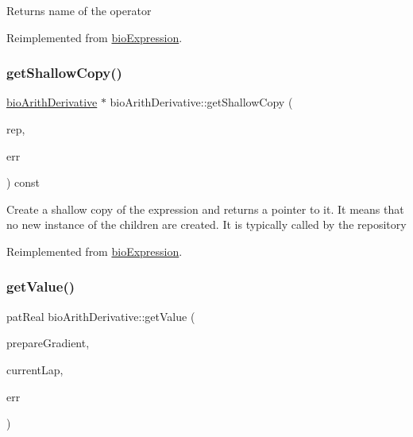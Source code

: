 \begin{DoxyReturn}{Returns}
name of the operator 
\end{DoxyReturn}


Reimplemented from \hyperlink{classbio_expression_a2353a4afb3a2b0af7c63aba086a72bde}{bio\+Expression}.

\mbox{\label{classbio_arith_derivative_a37dadf7fcbcfe40bedb900926f3fe974}} 
\subsubsection{\texorpdfstring{get\+Shallow\+Copy()}{getShallowCopy()}}
{\footnotesize\ttfamily \hyperlink{classbio_arith_derivative}{bio\+Arith\+Derivative} $\ast$ bio\+Arith\+Derivative\+::get\+Shallow\+Copy (\begin{DoxyParamCaption}\item[{\hyperlink{classbio_expression_repository}{bio\+Expression\+Repository} $\ast$}]{rep,  }\item[{pat\+Error $\ast$\&}]{err }\end{DoxyParamCaption}) const\hspace{0.3cm}{\ttfamily [virtual]}}

Create a shallow copy of the expression and returns a pointer to it. It means that no new instance of the children are created. It is typically called by the repository 

Reimplemented from \hyperlink{classbio_expression_a442534762693b92baaf33928979a1bf8}{bio\+Expression}.

\mbox{\label{classbio_arith_derivative_a332059cd224467b4a687d39ac705f269}} 
\subsubsection{\texorpdfstring{get\+Value()}{getValue()}}
{\footnotesize\ttfamily pat\+Real bio\+Arith\+Derivative\+::get\+Value (\begin{DoxyParamCaption}\item[{pat\+Boolean}]{prepare\+Gradient,  }\item[{pat\+U\+Long}]{current\+Lap,  }\item[{pat\+Error $\ast$\&}]{err }\end{DoxyParamCaption})\hspace{0.3cm}{\ttfamily [virtual]}}

